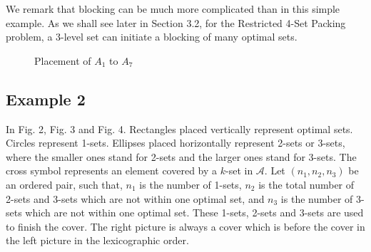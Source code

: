 \documentclass[runningheads,a4paper]{llncs}
\numberwithin{equation}{section}
\begin{document}
\begin{example}[Blocking]
We remark that blocking can be much more complicated than in this simple example. As we shall see later in Section 3.2, for the Restricted 4-Set Packing problem, a 3-level set can initiate a blocking of many optimal sets.



\begin{figure}
\begin{center}

\caption{Placement of $A_1$ to $A_7$}
\end{center}
\end{figure}

\end{example}


\subsection{Example 2}
\begin{example}
In Fig. 2, Fig. 3 and Fig. 4. Rectangles placed vertically represent optimal sets. Circles represent 1-sets. Ellipses placed horizontally represent 2-sets or 3-sets, where the smaller ones stand for 2-sets and the larger ones stand for 3-sets. The cross symbol represents an element covered by a $k$-set in $\mathscr{A}$. Let $(n_1,n_2,n_3)$ be an ordered pair, such that, $n_1$ is the number of 1-sets, $n_2$ is the total number of 2-sets and 3-sets which are not within one optimal set, and $n_3$ is the number of 3-sets which are not within one optimal set. These 1-sets, 2-sets and 3-sets are used to finish the cover. The right picture is always a cover which is before the cover in the left picture in the lexicographic order.
\end{example}
\end{document}

